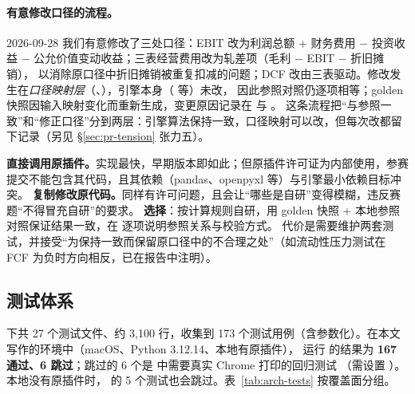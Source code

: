 \paragraph{有意修改口径的流程。}2026-09-28 我们有意修改了三处口径：EBIT 改为利润总额 + 财务费用 − 投资收益 − 公允价值变动收益；三表经营费用改为轧差项（毛利 − EBIT − 折旧摊销），
以消除原口径中折旧摊销被重复扣减的问题；DCF 改由三表驱动。修改发生在\emph{口径映射层}（、），引擎本身（ 等）未改，
因此参照对照仍逐项相等；golden 快照因输入映射变化而重新生成，变更原因记录在  与 。
这条流程把“与参照一致”和“修正口径”分到两层：引擎算法保持一致，口径映射可以改，但每次改都留下记录（另见 \S\ref{sec:pr-tension} 张力五）。

\begin{tradeoff}
\textbf{直接调用原插件。}实现最快，早期版本即如此；但原插件许可证为内部使用，参赛提交不能包含其代码，且其依赖（pandas、openpyxl 等）与引擎最小依赖目标冲突。
\textbf{复制修改原代码。}同样有许可问题，且会让“哪些是自研”变得模糊，违反赛题“不得冒充自研”的要求。
\textbf{选择}：按计算规则自研，用 golden 快照 + 本地参照对照保证结果一致，在  逐项说明参照关系与校验方式。
代价是需要维护两套测试，并接受“为保持一致而保留原口径中的不合理之处”（如流动性压力测试在 FCF 为负时方向相反，已在报告中注明）。
\end{tradeoff}

\subsection{测试体系}
\label{sec:arch-tests}

 下共 27 个测试文件、约 3,100 行，收集到 173 个测试用例（含参数化）。在本文写作的环境中（macOS、Python 3.12.14、本地有原插件），
运行  的结果为 \textbf{167 通过、6 跳过}；跳过的 6 个是  中需要真实 Chrome 打印的回归测试
（需设置 ）。本地没有原插件时， 的 5 个测试也会跳过。表~\ref{tab:arch-tests} 按覆盖面分组。

